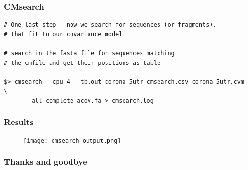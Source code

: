 \begin{frame}[c, fragile]\frametitle{CMsearch}
    \begin{lstlisting}
# One last step - now we search for sequences (or fragments),
# that fit to our covariance model.

# search in the fasta file for sequences matching
# the cmfile and get their positions as table

$> cmsearch --cpu 4 --tblout corona_5utr_cmsearch.csv corona_5utr.cvm \ 
        all_complete_acov.fa > cmsearch.log
    \end{lstlisting}
\end{frame}

\begin{frame}[t]\frametitle{Results}
  \begin{figure}
    \centering
    \hspace*{-2em}\texttt{[image: cmsearch\_output.png]}
  \end{figure}
\end{frame}

\begin{frame}[c]\frametitle{Thanks and goodbye}
  
\end{frame}


\beginbackup

\backupend

